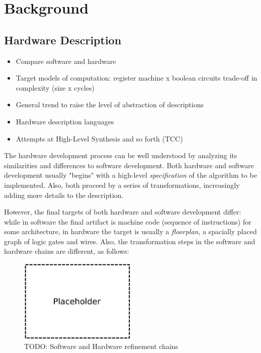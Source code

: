 \chapter{Background}
\label{chap:hardware}

    \section{Hardware Description}
    \label{sec:hardware-description}
        \begin{itemize}
            \item Compare software and hardware
            \item Target models of computation: register machine x boolean circuits
                \subitem trade-off in complexity (size x cycles)

            \item General trend to raise the level of abstraction of descriptions
            \item Hardware description languages

            \item Attempts at High-Level Synthesis and so forth (TCC)
        \end{itemize}

        The hardware development process can be well understood by analyzing its
        similarities and differences to software development.
        Both hardware and software development usually "begins" with a high-level \emph{specification}
        of the algorithm to be implemented.
        Also, both proceed by a series of transformations, increasingly adding more details to the description.

        However, the final targets of both hardware and software development differ:
        while in software the final artifact is machine code (sequence of instructions) for some architecture,
        in hardware the target is usually a \emph{floorplan}, a spacially placed graph of logic gates and wires.
        Also, the transformation steps in the software and hardware chains are different, as follows:

        \begin{figure}[h]
            \centerline{\includegraphics[width=0.5\textwidth]{imgs/sw-hw-chains.pdf}}
            \caption{TODO: Software and Hardware refinement chains \label{fig:sw-hw-chains}}
        \end{figure}

